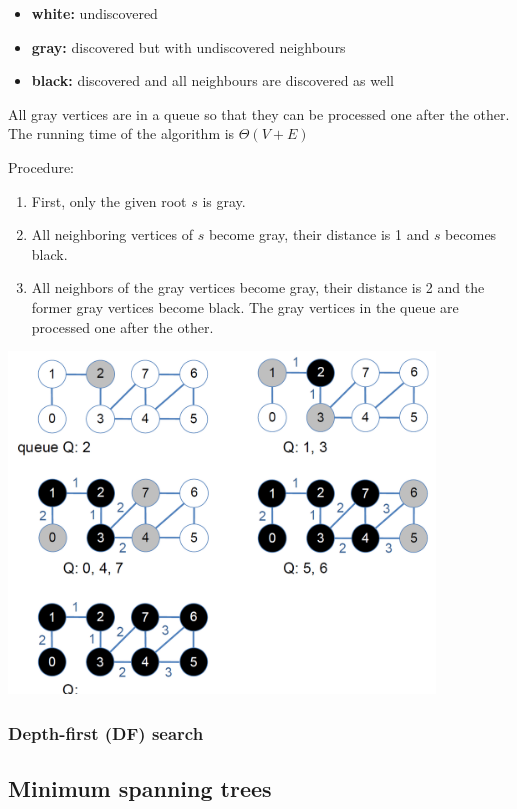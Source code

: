 \begin{itemize}
    \item \textbf{white:} undiscovered
    \item \textbf{gray:} discovered but with undiscovered neighbours
    \item \textbf{black:} discovered and all neighbours are discovered as well
\end{itemize}

All gray vertices are in a queue so that they can be processed one after the other. The running time of the algorithm is $\Theta(V+E)$

Procedure:
\begin{enumerate}
    \item First, only the given root $s$ is gray.
    \item All neighboring vertices of $s$ become gray, their distance is 1 and $s$ becomes black.
    \item All neighbors of the gray vertices become gray, their distance is 2 and the former gray vertices become black. The gray vertices in the queue are processed one after the other.
\end{enumerate}

\begin{center}\includegraphics[width=0.85\textwidth]{img/graphs/BfSearch.png}\end{center}

\subsubsection{Depth-first (DF) search}

\subsection{Minimum spanning trees}


